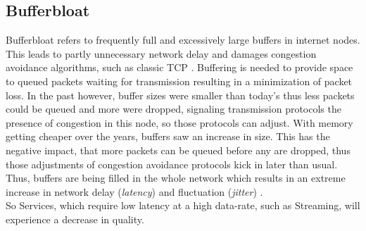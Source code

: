 \documentclass[a4paper,conference]{IEEEtran}
\begin{document}
\subsection*{Bufferbloat}
Bufferbloat refers to frequently full and excessively large buffers in internet nodes. This leads to partly unnecessary network delay and damages congestion avoidance algorithms, such as classic TCP \cite{gettys2012bufferbloat,chen2014bufferbloat}. Buffering is needed to provide space to queued packets waiting for transmission resulting in a minimization of packet loss. In the past however, buffer sizes were smaller than today's thus less packets could be queued and more were dropped, signaling transmission protocols the presence of congestion in this node, so those protocols can adjust. With memory getting cheaper over the years, buffers saw an increase in size. This has the negative impact, that more packets can be queued before any are dropped, thus those adjustments of congestion avoidance protocols kick in later than usual. Thus, buffers are being filled in the whole network which results in an extreme increase in network delay (\textit{latency}) and fluctuation (\textit{jitter}) \cite{gettys2012bufferbloat,staff2012bufferbloat,chen2014bufferbloat}.
\\So Services, which require low latency at a high data-rate, such as Streaming, will experience a decrease in quality.
\end{document}
